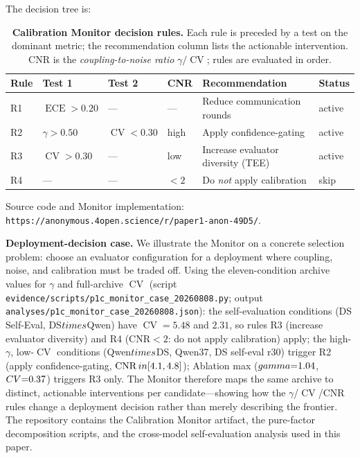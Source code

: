 \documentclass[11pt]{article}
\DeclareMathOperator{\CV}{CV}
\DeclareMathOperator{\ECE}{ECE}
\DeclareMathOperator{\CNR}{CNR}
\begin{document}
The decision tree is:

\begin{table}[t]
\centering
\caption{\textbf{Calibration Monitor decision rules.} Each rule is preceded by a test on the dominant metric; the recommendation column lists the actionable intervention. CNR is the \textit{coupling-to-noise ratio} $\gamma / \CV$; rules are evaluated in order.}
\label{tab:monitor}
\small
\begin{tabular}{@{}p{2.2cm}p{2.0cm}p{2.0cm}p{2.0cm}p{3.6cm}p{2.4cm}@{}}
\toprule
\textbf{Rule} & \textbf{Test 1} & \textbf{Test 2} & \textbf{CNR} & \textbf{Recommendation} & \textbf{Status} \\
\midrule
R1 & $\ECE > 0.20$ & --- & --- & Reduce communication rounds               & active \\
R2 & $\gamma > 0.50$ & $\CV < 0.30$ & high & Apply confidence-gating                 & active \\
R3 & $\CV > 0.30$    & ---          & low  & Increase evaluator diversity (TEE)     & active \\
R4 & ---             & ---          & $<2$ & Do \emph{not} apply calibration         & skip   \\
\bottomrule
\end{tabular}
\end{table}

\noindent Source code and Monitor implementation: \texttt{https://anonymous.4open.science/r/paper1-anon-49D5/}.

\noindent\textbf{Deployment-decision case.} We illustrate the Monitor on a concrete selection problem: choose an evaluator configuration for a deployment where coupling, noise, and calibration must be traded off. Using the eleven-condition archive values for $\gamma$ and full-archive $\CV$ (script \texttt{evidence/scripts/p1c\_monitor\_case\_20260808.py}; output \texttt{analyses/p1c\_monitor\_case\_20260808.json}): the self-evaluation conditions (DS Self-Eval, DS$\\times$Qwen) have $\CV{=}5.48$ and $2.31$, so rules R3 (increase evaluator diversity) and R4 (CNR$<2$: do not apply calibration) apply; the high-$\gamma$, low-$\CV$ conditions (Qwen$\\times$DS, Qwen37, DS self-eval r30) trigger R2 (apply confidence-gating, $\CNR \\in [4.1, 4.8]$); Ablation max ($\\gamma{=}1.04$, $\\CV{=}0.37$) triggers R3 only. The Monitor therefore maps the same archive to distinct, actionable interventions per candidate---showing how the $\gamma$/$\CV$/CNR rules change a deployment decision rather than merely describing the frontier.
The repository contains the Calibration Monitor artifact, the pure-factor decomposition scripts, and the cross-model self-evaluation analysis used in this paper.
\end{document}
